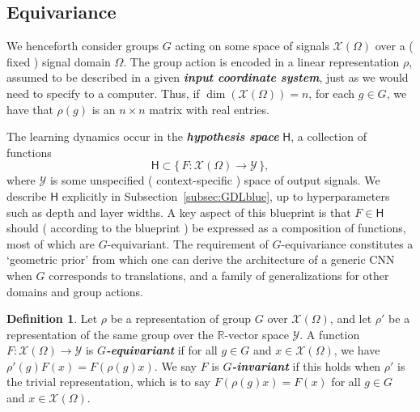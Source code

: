 \documentclass[12pt]{article}
\numberwithin{equation}{section}
\theoremstyle{definition}
\newtheorem{defn}[thm]{Definition}
\newcommand{		\R		}	{	\mathbb{R}				}
\newcommand{		\cX		}	{	\mathcal{X}				}
\newcommand{		\B		}	{\textbf					} %
\newcommand{		\Oh		}	{	\Omega					}
\newcommand{		\1		}	{	\bm{1}					}%
\begin{document}
\vspace{5mm}

\subsection{Equivariance}

\vspace{5mm}

We henceforth consider groups $G$ acting on some space of signals $\cX(\Oh)$ over a ( fixed ) signal domain $\Oh$. The group action is encoded in a linear representation $\rho$, assumed to be described in a given \emph{\B{input coordinate system}}, just as we would need to specify to a computer. Thus, if $\dim ( \cX(\Oh) ) = n$, for each $g \in G$, we have that $\rho(g)$ is an $n \times n$ matrix with real entries.  

The learning dynamics occur in the \emph{\B{hypothesis space}} $\textsf{H}$, a collection of functions 
$$
\textsf{H} \subset \{\, F : \cX(\Oh) \to \mathcal{Y}\, \} ,
$$
where $\mathcal{Y}$ is some unspecified ( context-specific ) space of output signals. We describe $\textsf{H}$ explicitly in Subsection~\ref{subsec:GDLblue}, up to hyperparameters such as depth and layer widths. A key aspect of this blueprint is that $F \in \textsf{H}$ should ( according to the blueprint ) be expressed as a composition of functions, most of which are $G$-equivariant. The requirement of $G$-equivariance constitutes a `geometric prior' from which one can derive the architecture of a generic CNN when $G$ corresponds to translations, and a family of generalizations for other domains and group actions.  

\begin{defn} Let $\rho$ be a representation of group $G$ over $\mathcal{X}(\Oh)$, and let $\rho'$ be a representation of the same group over the $\R$-vector space $\mathcal{Y}$. A function $F: \mathcal{X}(\Oh) \to \mathcal{Y}$ is \emph{\B{$G$-equivariant}} if for all $g \in G$ and $x \in \cX(\Oh)$, we have $\rho'(g) F(x) = F ( \rho(g) x )$. We say $F$ is \emph{\B{$G$-invariant}} if this holds when $\rho'$ is the trivial representation, which is to say $F ( \rho(g) x) = F(x)$ for all $g \in G$ and $x \in \mathcal{X}(\Omega)$.
\end{defn}

\end{document}
